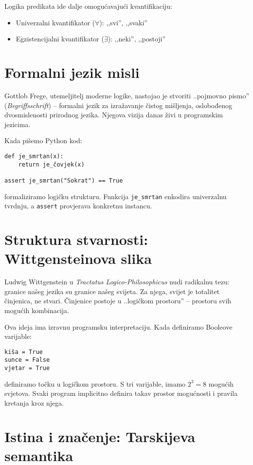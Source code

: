 Logika predikata ide dalje omogućavajući kvantifikaciju:
\begin{itemize}
\item Univerzalni kvantifikator ($\forall$): ,,svi'', ,,svaki''
\item Egzistencijalni kvantifikator ($\exists$): ,,neki'', ,,postoji''
\end{itemize}


\section{Formalni jezik misli}


Gottlob Frege, utemeljitelj moderne logike, nastojao je stvoriti ..pojmovno pismo'' (\textit{Begriffsschrift}) -- formalni jezik za izražavanje čistog mišljenja, oslobođenog dvosmislenosti prirodnog jezika. Njegova vizija danas živi u programskim jezicima.


Kada pišemo Python kod:
\begin{verbatim}
def je_smrtan(x):
    return je_čovjek(x)

assert je_smrtan("Sokrat") == True
\end{verbatim}


formaliziramo logičku strukturu. Funkcija \texttt{je\_smrtan} enkodira univerzalnu tvrdnju, a \texttt{assert} provjerava konkretnu instancu.


\section{Struktura stvarnosti: Wittgensteinova slika}


Ludwig Wittgenstein u \textit{Tractatus Logico-Philosophicus} nudi radikalnu tezu: granice našeg jezika su granice našeg svijeta. Za njega, svijet je totalitet činjenica, ne stvari. Činjenice postoje u ..logičkom prostoru'' -- prostoru svih mogućih kombinacija.


Ova ideja ima izravnu programsku interpretaciju. Kada definiramo Booleove varijable:
\begin{verbatim}
kiša = True
sunce = False
vjetar = True
\end{verbatim}


definiramo točku u logičkom prostoru. S tri varijable, imamo $2^3 = 8$ mogućih svjetova. Svaki program implicitno definira takav prostor mogućnosti i pravila kretanja kroz njega.


\section{Istina i značenje: Tarskijeva semantika}


